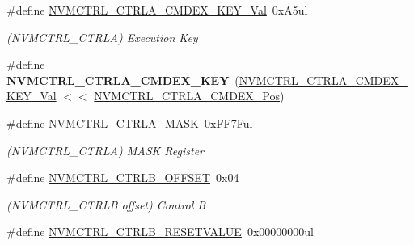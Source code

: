 \begin{DoxyCompactItemize}
\item 
\hypertarget{group___s_a_m_l21___n_v_m_c_t_r_l_ga22224d9a78d4033732134f8b564ba6d9}{}\#define \hyperlink{group___s_a_m_l21___n_v_m_c_t_r_l_ga22224d9a78d4033732134f8b564ba6d9}{N\+V\+M\+C\+T\+R\+L\+\_\+\+C\+T\+R\+L\+A\+\_\+\+C\+M\+D\+E\+X\+\_\+\+K\+E\+Y\+\_\+\+Val}~0x\+A5ul\label{group___s_a_m_l21___n_v_m_c_t_r_l_ga22224d9a78d4033732134f8b564ba6d9}

\begin{DoxyCompactList}\small\item\em (N\+V\+M\+C\+T\+R\+L\+\_\+\+C\+T\+R\+L\+A) Execution Key \end{DoxyCompactList}\item 
\hypertarget{group___s_a_m_l21___n_v_m_c_t_r_l_gab13bf4c69aa0378ad5cc866fe066e8c5}{}\#define {\bfseries N\+V\+M\+C\+T\+R\+L\+\_\+\+C\+T\+R\+L\+A\+\_\+\+C\+M\+D\+E\+X\+\_\+\+K\+E\+Y}~(\hyperlink{group___s_a_m_l21___n_v_m_c_t_r_l_ga22224d9a78d4033732134f8b564ba6d9}{N\+V\+M\+C\+T\+R\+L\+\_\+\+C\+T\+R\+L\+A\+\_\+\+C\+M\+D\+E\+X\+\_\+\+K\+E\+Y\+\_\+\+Val}   $<$$<$ \hyperlink{group___s_a_m_l21___n_v_m_c_t_r_l_ga6ac235db7c8301778321fa6898c7f490}{N\+V\+M\+C\+T\+R\+L\+\_\+\+C\+T\+R\+L\+A\+\_\+\+C\+M\+D\+E\+X\+\_\+\+Pos})\label{group___s_a_m_l21___n_v_m_c_t_r_l_gab13bf4c69aa0378ad5cc866fe066e8c5}

\item 
\hypertarget{group___s_a_m_l21___n_v_m_c_t_r_l_ga59f02a3ccafaec97563b7369c88d548c}{}\#define \hyperlink{group___s_a_m_l21___n_v_m_c_t_r_l_ga59f02a3ccafaec97563b7369c88d548c}{N\+V\+M\+C\+T\+R\+L\+\_\+\+C\+T\+R\+L\+A\+\_\+\+M\+A\+S\+K}~0x\+F\+F7\+Ful\label{group___s_a_m_l21___n_v_m_c_t_r_l_ga59f02a3ccafaec97563b7369c88d548c}

\begin{DoxyCompactList}\small\item\em (N\+V\+M\+C\+T\+R\+L\+\_\+\+C\+T\+R\+L\+A) M\+A\+S\+K Register \end{DoxyCompactList}\item 
\hypertarget{group___s_a_m_l21___n_v_m_c_t_r_l_ga96b31df212035cedc4f6a370222e5b67}{}\#define \hyperlink{group___s_a_m_l21___n_v_m_c_t_r_l_ga96b31df212035cedc4f6a370222e5b67}{N\+V\+M\+C\+T\+R\+L\+\_\+\+C\+T\+R\+L\+B\+\_\+\+O\+F\+F\+S\+E\+T}~0x04\label{group___s_a_m_l21___n_v_m_c_t_r_l_ga96b31df212035cedc4f6a370222e5b67}

\begin{DoxyCompactList}\small\item\em (N\+V\+M\+C\+T\+R\+L\+\_\+\+C\+T\+R\+L\+B offset) Control B \end{DoxyCompactList}\item 
\hypertarget{group___s_a_m_l21___n_v_m_c_t_r_l_gac0a835cf0ee617133dc445147d2af448}{}\#define \hyperlink{group___s_a_m_l21___n_v_m_c_t_r_l_gac0a835cf0ee617133dc445147d2af448}{N\+V\+M\+C\+T\+R\+L\+\_\+\+C\+T\+R\+L\+B\+\_\+\+R\+E\+S\+E\+T\+V\+A\+L\+U\+E}~0x00000000ul\label{group___s_a_m_l21___n_v_m_c_t_r_l_gac0a835cf0ee617133dc445147d2af448}


\end{DoxyCompactItemize}
